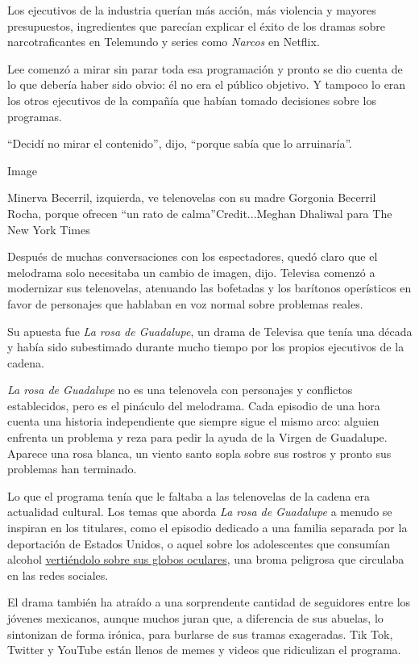 Los ejecutivos de la industria querían más acción, más violencia y
mayores presupuestos, ingredientes que parecían explicar el éxito de los
dramas sobre narcotraficantes en Telemundo y series como \emph{Narcos}
en Netflix.

Lee comenzó a mirar sin parar toda esa programación y pronto se dio
cuenta de lo que debería haber sido obvio: él no era el público
objetivo. Y tampoco lo eran los otros ejecutivos de la compañía que
habían tomado decisiones sobre los programas.

``Decidí no mirar el contenido'', dijo, ``porque sabía que lo
arruinaría''.

Image

Minerva Becerril, izquierda, ve telenovelas con su madre Gorgonia
Becerril Rocha, porque ofrecen ``un rato de calma''Credit...Meghan
Dhaliwal para The New York Times

Después de muchas conversaciones con los espectadores, quedó claro que
el melodrama solo necesitaba un cambio de imagen, dijo. Televisa comenzó
a modernizar sus telenovelas, atenuando las bofetadas y los barítonos
operísticos en favor de personajes que hablaban en voz normal sobre
problemas reales.

Su apuesta fue \emph{La rosa de Guadalupe}, un drama de Televisa que
tenía una década y había sido subestimado durante mucho tiempo por los
propios ejecutivos de la cadena.

\emph{La rosa de Guadalupe} no es una telenovela con personajes y
conflictos establecidos, pero es el pináculo del melodrama. Cada
episodio de una hora cuenta una historia independiente que siempre sigue
el mismo arco: alguien enfrenta un problema y reza para pedir la ayuda
de la Virgen de Guadalupe. Aparece una rosa blanca, un viento santo
sopla sobre sus rostros y pronto sus problemas han terminado.

Lo que el programa tenía que le faltaba a las telenovelas de la cadena
era actualidad cultural. Los temas que aborda \emph{La rosa de
Guadalupe} a menudo se inspiran en los titulares, como el episodio
dedicado a una familia separada por la deportación de Estados Unidos, o
aquel sobre los adolescentes que consumían alcohol
\href{https://www.ncbi.nlm.nih.gov/pmc/articles/PMC4009175/}{vertiéndolo
sobre sus globos oculares}, una broma peligrosa que circulaba en las
redes sociales.

El drama también ha atraído a una sorprendente cantidad de seguidores
entre los jóvenes mexicanos, aunque muchos juran que, a diferencia de
sus abuelas, lo sintonizan de forma irónica, para burlarse de sus tramas
exageradas. Tik Tok, Twitter y YouTube están llenos de memes y videos
que ridiculizan el programa.

